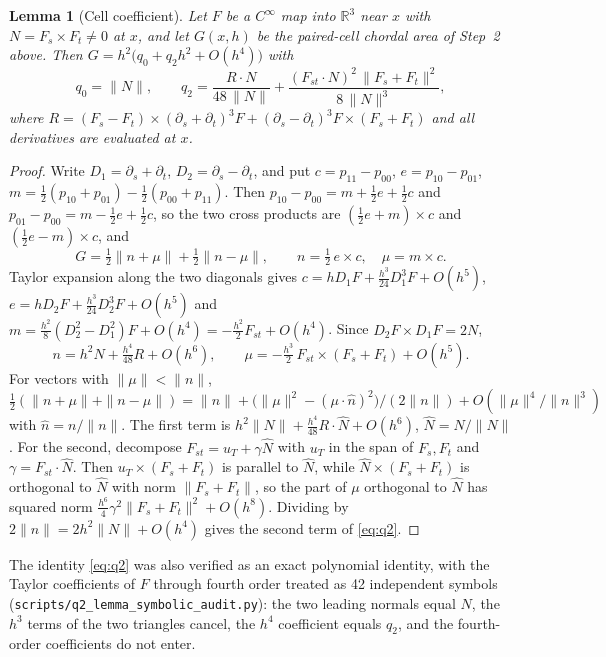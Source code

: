 \documentclass[11pt]{article}
\newtheorem{lemma}{Lemma}
\theoremstyle{remark}
\newcommand{\R}{\mathbb{R}}
\begin{document}
\begin{lemma}[Cell coefficient]\label{lem:q2}
Let $F$ be a $C^\infty$ map into $\R^3$ near $x$ with $N=F_s\times F_t\neq0$ at $x$, and let
$G(x,h)$ be the paired-cell chordal area of Step~2 above. Then
$G=h^2\bigl(q_0+q_2h^2+O(h^4)\bigr)$ with
\begin{equation}\label{eq:q2}
q_0=\|N\|,\qquad
q_2=\frac{R\cdot N}{48\,\|N\|}+\frac{(F_{st}\cdot N)^2\,\|F_s+F_t\|^2}{8\,\|N\|^3},
\end{equation}
where $R=(F_s-F_t)\times(\partial_s+\partial_t)^3F+(\partial_s-\partial_t)^3F\times(F_s+F_t)$
and all derivatives are evaluated at $x$.
\end{lemma}
\begin{proof}
Write $D_1=\partial_s+\partial_t$, $D_2=\partial_s-\partial_t$, and put
$c=p_{11}-p_{00}$, $e=p_{10}-p_{01}$, $m=\tfrac12(p_{10}+p_{01})-\tfrac12(p_{00}+p_{11})$.
Then $p_{10}-p_{00}=m+\tfrac12e+\tfrac12c$ and $p_{01}-p_{00}=m-\tfrac12e+\tfrac12c$, so the
two cross products are $(\tfrac12e+m)\times c$ and $(\tfrac12e-m)\times c$, and
\[
G=\tfrac12\|n+\mu\|+\tfrac12\|n-\mu\|,\qquad n=\tfrac12\,e\times c,\quad\mu=m\times c .
\]
Taylor expansion along the two diagonals gives $c=hD_1F+\tfrac{h^3}{24}D_1^3F+O(h^5)$,
$e=hD_2F+\tfrac{h^3}{24}D_2^3F+O(h^5)$ and
$m=\tfrac{h^2}{8}(D_2^2-D_1^2)F+O(h^4)=-\tfrac{h^2}{2}F_{st}+O(h^4)$. Since
$D_2F\times D_1F=2N$,
\[
n=h^2N+\tfrac{h^4}{48}R+O(h^6),\qquad\mu=-\tfrac{h^3}{2}\,F_{st}\times(F_s+F_t)+O(h^5).
\]
For vectors with $\|\mu\|<\|n\|$,
$\tfrac12(\|n+\mu\|+\|n-\mu\|)=\|n\|+\bigl(\|\mu\|^2-(\mu\cdot\hat n)^2\bigr)/(2\|n\|)
+O(\|\mu\|^4/\|n\|^3)$ with $\hat n=n/\|n\|$. The first term is
$h^2\|N\|+\tfrac{h^4}{48}R\cdot\hat N+O(h^6)$, $\hat N=N/\|N\|$. For the second, decompose
$F_{st}=u_T+\gamma\hat N$ with $u_T$ in the span of $F_s,F_t$ and $\gamma=F_{st}\cdot\hat N$.
Then $u_T\times(F_s+F_t)$ is parallel to $\hat N$, while $\hat N\times(F_s+F_t)$ is
orthogonal to $\hat N$ with norm $\|F_s+F_t\|$, so the part of $\mu$ orthogonal to $\hat N$
has squared norm $\tfrac{h^6}{4}\gamma^2\|F_s+F_t\|^2+O(h^8)$. Dividing by $2\|n\|=2h^2\|N\|+O(h^4)$
gives the second term of \eqref{eq:q2}.
\end{proof}
{\sloppy The identity \eqref{eq:q2} was also verified as an exact polynomial identity, with the
Taylor coefficients of $F$ through fourth order treated as 42 independent symbols
(\texttt{scripts/q2\_lemma\_symbolic\_audit.py}): the two leading normals equal $N$, the
$h^3$ terms of the two triangles cancel, the $h^4$ coefficient equals $q_2$, and the
fourth-order coefficients do not enter.\par}
\end{document}
